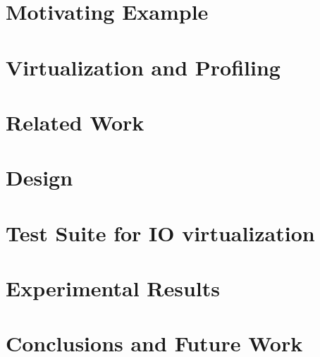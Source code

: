 \documentclass[10pt,onecolumn,oneside]{article}
\begin{document}
\section{Motivating Example}


\section{Virtualization and Profiling}


\section{Related Work}


\section{Design}


\section{Test Suite for IO virtualization}


\section{Experimental Results}


\section{Conclusions and Future Work}


\end{document}
